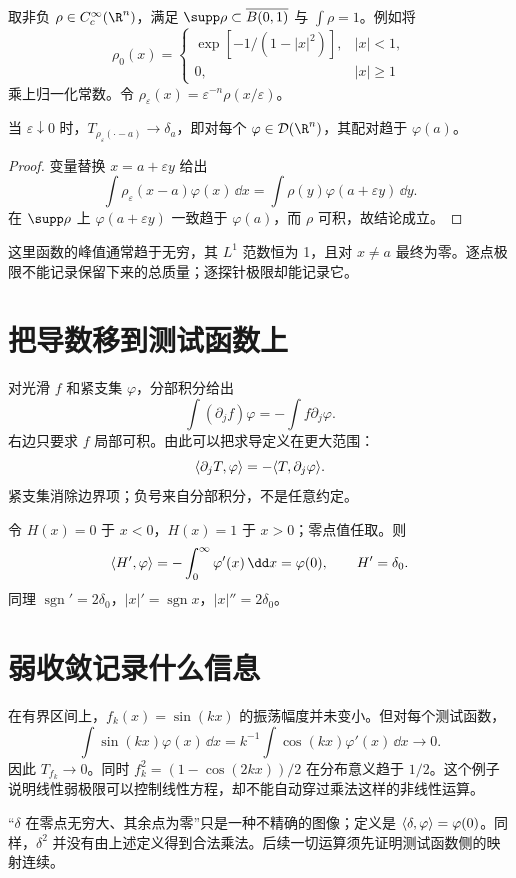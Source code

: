 取非负 $\rho\in C_c^\infty(\R^n)$，满足 $\supp\rho\subset\overline{B(0,1)}$ 与 $\int\rho=1$。例如将
\[
 \rho_0(x)=\begin{cases}\exp[-1/(1-|x|^2)],&|x|<1,\\0,&|x|\ge1\end{cases}
\]
乘上归一化常数。令 $\rho_\varepsilon(x)=\varepsilon^{-n}\rho(x/\varepsilon)$。
\begin{proposition}[集中质量的极限]\label{prop:delta-approx}
当 $\varepsilon\downarrow0$ 时，$T_{\rho_\varepsilon(\cdot-a)}\to\delta_a$，即对每个 $\varphi\in\Test(\R^n)$，其配对趋于 $\varphi(a)$。
\end{proposition}
\begin{proof}
变量替换 $x=a+\varepsilon y$ 给出
\[
 \int\rho_\varepsilon(x-a)\varphi(x)\,\dd x
 =\int\rho(y)\varphi(a+\varepsilon y)\,\dd y.
\]
在 $\supp\rho$ 上 $\varphi(a+\varepsilon y)$ 一致趋于 $\varphi(a)$，而 $\rho$ 可积，故结论成立。
\end{proof}
这里函数的峰值通常趋于无穷，其 $L^1$ 范数恒为 1，且对 $x\ne a$ 最终为零。逐点极限不能记录保留下来的总质量；逐探针极限却能记录它。

\section{把导数移到测试函数上}
对光滑 $f$ 和紧支集 $\varphi$，分部积分给出
\[
 \int (\partial_j f)\varphi=-\int f\partial_j\varphi.
\]
右边只要求 $f$ 局部可积。由此可以把求导定义在更大范围：
\begin{equation}\label{eq:derivative-preview}
 \langle \partial_jT,\varphi\rangle=-\langle T,\partial_j\varphi\rangle.
\end{equation}
紧支集消除边界项；负号来自分部积分，不是任意约定。
\begin{example}[跳跃的导数]
令 $H(x)=0$ 于 $x<0$，$H(x)=1$ 于 $x>0$；零点值任取。则
\[
 \Pair{H'}{\varphi}=-\int_0^\infty\varphi'(x)\,\dd x=\varphi(0),
 \qquad H'=\delta_0.
\]
同理 $\operatorname{sgn}'=2\delta_0$，$|x|'=\operatorname{sgn}x$，$|x|''=2\delta_0$。
\end{example}

\section{弱收敛记录什么信息}
在有界区间上，$f_k(x)=\sin(kx)$ 的振荡幅度并未变小。但对每个测试函数，
\[
 \int\sin(kx)\varphi(x)\,\dd x
 =k^{-1}\int\cos(kx)\varphi'(x)\,\dd x\longrightarrow0.
\]
因此 $T_{f_k}\to0$。同时 $f_k^2=(1-\cos(2kx))/2$ 在分布意义趋于 $1/2$。这个例子说明线性弱极限可以控制线性方程，却不能自动穿过乘法这样的非线性运算。
\begin{pitfall}[符号计算必须有定义域]
“$\delta$ 在零点无穷大、其余点为零”只是一种不精确的图像；定义是 $\langle \delta,\varphi\rangle=\varphi(0)$。同样，$\delta^2$ 并没有由上述定义得到合法乘法。后续一切运算须先证明测试函数侧的映射连续。
\end{pitfall}

